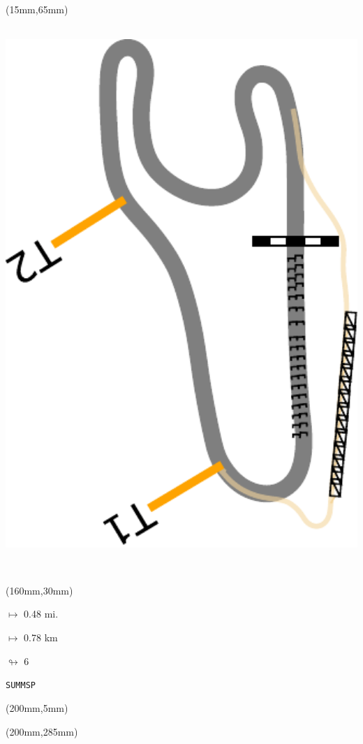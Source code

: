 \begin{textblock*}{185mm}(15mm,65mm)%
\centering
\mbox{\includegraphics[width=185mm,height=210mm,keepaspectratio]{PT/SUMMSP.pdf}}
\end{textblock*}
\begin{textblock*}{40mm}(160mm,30mm)%
\Large
\par$\mapsto$ 0.48 mi.
\par$\mapsto$ 0.78 km
\par$\looparrowright$ 6
\par\hfill\tiny\tt SUMMSP\\
\end{textblock*}
\begin{textblock*}{20mm}(200mm,5mm)%
\fbox{\thepage}
\label{SUMMSP}
\end{textblock*}
\begin{textblock*}{20mm}(200mm,285mm)%
\fbox{\thepage}
\end{textblock*}

